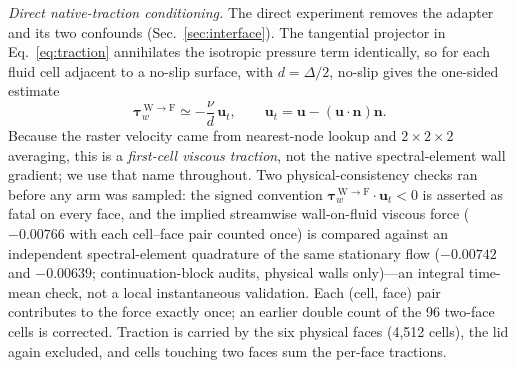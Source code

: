 \emph{Direct native-traction conditioning.} The direct experiment removes the adapter and its two
confounds (Sec.~\ref{sec:interface}). The tangential projector in Eq.~\eqref{eq:traction}
annihilates the isotropic pressure term identically, so for each fluid cell adjacent to a no-slip
surface, with $d=\Delta/2$, no-slip gives the one-sided estimate
\begin{equation}
\boldsymbol\tau_w^{\,\mathrm{W\to F}}\simeq-\frac{\nu}{d}\,\mathbf u_t,
\qquad \mathbf u_t=\mathbf u-(\mathbf u\!\cdot\!\mathbf n)\mathbf n .
\label{eq:nativetau}
\end{equation}
Because the raster velocity came from nearest-node lookup and $2\times2\times2$ averaging, this is
a \emph{first-cell viscous traction}, not the native spectral-element wall gradient; we use that
name throughout. Two physical-consistency checks ran before any arm was sampled: the signed convention
$\boldsymbol\tau_w^{\,\mathrm{W\to F}}\!\cdot\mathbf u_t<0$ is asserted as fatal on every face,
and the implied streamwise wall-on-fluid viscous force ($-0.00766$ with each cell--face pair
counted once) is compared against an independent
spectral-element quadrature of the same stationary flow ($-0.00742$ and $-0.00639$;
continuation-block audits, physical
walls only)---an integral time-mean check, not a local instantaneous validation. Each
(cell, face) pair contributes to the force exactly once; an earlier double count of the 96
two-face cells is corrected. Traction is carried by the six physical faces
(4,512 cells), the lid again excluded, and cells touching two faces sum the per-face tractions.

